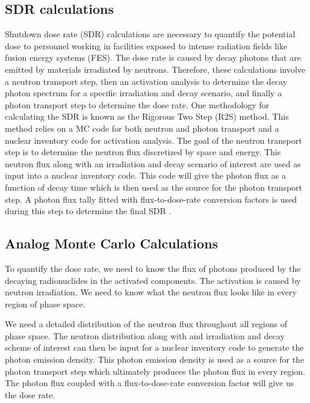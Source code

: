 \subsection{SDR calculations}
Shutdown dose rate (SDR) calculations are necessary to quantify the potential
dose to personnel working in facilities exposed to intense radiation fields
like fusion energy systems (FES).  The dose rate is caused by decay photons
that are emitted by materials irradiated by neutrons.  Therefore, these calculations involve a neutron
transport step, then an activation analysis to determine the decay photon
spectrum for a specific irradiation and decay scenario,
and finally a photon transport step to determine the dose rate.
One methodology for calculating the SDR is known as the Rigorous Two Step (R2S)
method.  This method relies on a MC code for both neutron and photon transport
and a nuclear inventory code for activation analysis.
The goal of the neutron transport step is to determine the neutron flux
discretized by space and energy.  This neutron flux along with an irradiation
and decay scenario of interest are used as input into a nuclear inventory
code.  This code will give the photon flux as a function of decay time which
is then used as the source for the photon transport step.  A photon flux tally
fitted with flux-to-dose-rate conversion factors is used during this step to
determine the final SDR \cite{Chen_2002}.


\subsection{Analog Monte Carlo Calculations}

To quantify the dose rate, we need to know the flux of photons
produced by the decaying radionuclides in the activated components. The
activation is caused by neutron irradiation.
We need to know what the neutron flux looks like in every region of phase
space.

We need a detailed distribution of the neutron flux throughout all regions of phase
space.
The neutron distribution along with and irradiation and decay scheme of interest 
can then be input for a nuclear inventory code to generate the photon
emission density.  This photon emission density is used as a source for the
photon transport step which ultimately produces the photon flux in every region.
The photon flux coupled with a flux-to-dose-rate conversion factor will give us
the dose rate.


